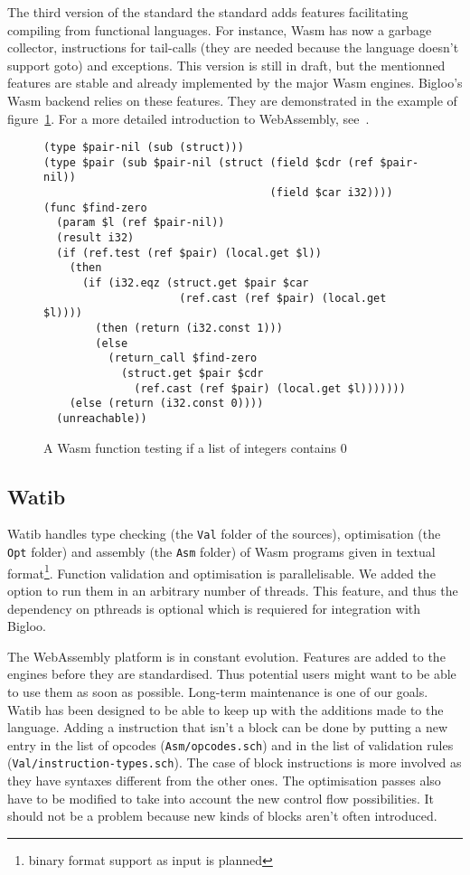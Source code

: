 \documentclass[10pt]{article}
\begin{document}
The third version of the standard the standard adds features facilitating
compiling from functional languages. For instance, Wasm has now a garbage
collector, instructions for tail-calls (they are needed because the language
doesn't support goto) and exceptions. This version is still in draft, but the
mentionned features are stable and already implemented by the major Wasm
engines. Bigloo's Wasm backend relies on these features. They are demonstrated
in the example of figure~\ref{ex}. For a more detailed introduction to
WebAssembly, see~\cite[Section~2.1]{phipps2023continuing}.

\begin{figure}[h]
  \begin{minipage}{\widthof{(type \$pair (sub \$pair-nil (struct (field \$cdr (ref \$pair-nil))}}
\begin{verbatim}
(type $pair-nil (sub (struct)))
(type $pair (sub $pair-nil (struct (field $cdr (ref $pair-nil))
                                   (field $car i32))))
(func $find-zero
  (param $l (ref $pair-nil))
  (result i32)
  (if (ref.test (ref $pair) (local.get $l))
    (then
      (if (i32.eqz (struct.get $pair $car
                     (ref.cast (ref $pair) (local.get $l))))
        (then (return (i32.const 1)))
        (else
          (return_call $find-zero
            (struct.get $pair $cdr
              (ref.cast (ref $pair) (local.get $l)))))))
    (else (return (i32.const 0))))
  (unreachable))
\end{verbatim}
  \end{minipage}

  \caption{A Wasm function testing if a list of integers contains 0}\label{ex}
\end{figure}

\subsection{Watib}
\textsf{Watib} handles type checking (the \texttt{Val} folder of the sources),
optimisation (the \texttt{Opt} folder) and assembly (the \texttt{Asm} folder) of
Wasm programs given in textual format\footnote{binary format support as input is
planned}. Function validation and optimisation is parallelisable. We added the
option to run them in an arbitrary number of threads. This feature, and thus the
dependency on pthreads is optional which is requiered for integration with
Bigloo.

The WebAssembly platform is in constant evolution. Features are added to the
engines before they are standardised. Thus potential users might want to be able
to use them as soon as possible. Long-term maintenance is one of our goals.
\textsf{Watib} has been designed to be able to keep up with the additions made
to the language. Adding a instruction that isn't a block can be done by putting
a new entry in the list of opcodes (\texttt{Asm/opcodes.sch}) and in the list of
validation rules (\texttt{Val/instruction-types.sch}). The case of block
instructions is more involved as they have syntaxes different from the other
ones. The optimisation passes also have to be modified to take into account the
new control flow possibilities. It should not be a problem because new kinds of
blocks aren't often introduced.
\end{document}
